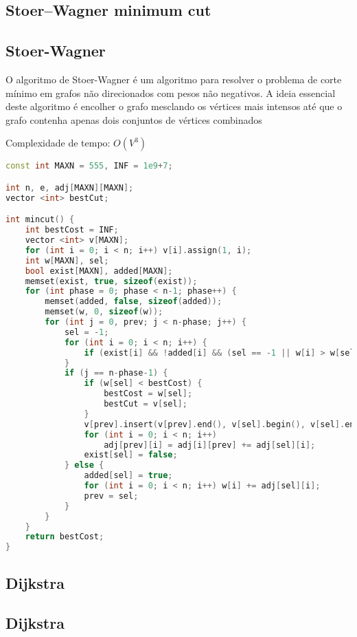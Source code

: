 \documentclass[11pt, a4paper, twoside]{article}
\begin{document}
\subsection{Stoer–Wagner minimum cut}

\subsection{Stoer-Wagner}


O algoritmo de Stoer-Wagner é um algoritmo para resolver o problema de corte mínimo em grafos não direcionados com pesos não negativos. A ideia essencial deste algoritmo é encolher o grafo mesclando os vértices mais intensos até que o grafo contenha apenas dois conjuntos de vértices combinados

Complexidade de tempo: $O(V^3)$

\begin{lstlisting}[language=C++]
const int MAXN = 555, INF = 1e9+7;

int n, e, adj[MAXN][MAXN];
vector <int> bestCut;

int mincut() {
    int bestCost = INF;
    vector <int> v[MAXN];
    for (int i = 0; i < n; i++) v[i].assign(1, i);
    int w[MAXN], sel;
    bool exist[MAXN], added[MAXN];
    memset(exist, true, sizeof(exist));
    for (int phase = 0; phase < n-1; phase++) {
        memset(added, false, sizeof(added));
        memset(w, 0, sizeof(w));
        for (int j = 0, prev; j < n-phase; j++) {
            sel = -1;
            for (int i = 0; i < n; i++) {
                if (exist[i] && !added[i] && (sel == -1 || w[i] > w[sel])) sel = i;
            }
            if (j == n-phase-1) {
                if (w[sel] < bestCost) {
                    bestCost = w[sel];
                    bestCut = v[sel];
                }
                v[prev].insert(v[prev].end(), v[sel].begin(), v[sel].end());
                for (int i = 0; i < n; i++) 
                    adj[prev][i] = adj[i][prev] += adj[sel][i];
                exist[sel] = false;
            } else {
                added[sel] = true;
                for (int i = 0; i < n; i++) w[i] += adj[sel][i];
                prev = sel;
            }
        }
    }
    return bestCost;
}
\end{lstlisting}

\subsection{Dijkstra}

\subsection{Dijkstra}
\end{document}
